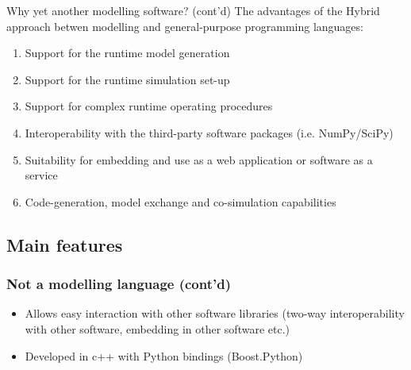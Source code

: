 \documentclass[compress,newPxFont,sthlmFooter]{beamer}
\begin{document}
\begin{frame}{Why \textcolor{sthlmRed}{yet another} modelling software? (cont'd)}
  The advantages of the \alert{Hybrid} approach betwen \alert{modelling} and \alert{general-purpose} programming languages:
\begin{enumerate}
  \item Support for the \alert{runtime model generation}
  \item Support for the \alert{runtime simulation set-up}
  \item Support for \alert{complex runtime operating procedures}
  \item \alert{Interoperability} with the \alert{third-party software} packages (i.e. NumPy/SciPy)
  \item Suitability for \alert{embedding} and use as a \alert{web application} or \alert{software as a service}
  \item \alert{Code-generation}, \alert{model exchange} and \alert{co-simulation} capabilities  
\end{enumerate}
\end{frame}

\subsection{Main features}
\begin{frame}
\frametitle{Not a modelling language (cont'd)}
\begin{block}{}
\begin{itemize}
  \item Allows easy interaction with other software libraries 
        (two-way interoperability with other software, embedding in other software etc.)
  \item Developed in c++ with Python bindings (Boost.Python)
\end{itemize}
\end{block}
\end{frame}
\end{document}

